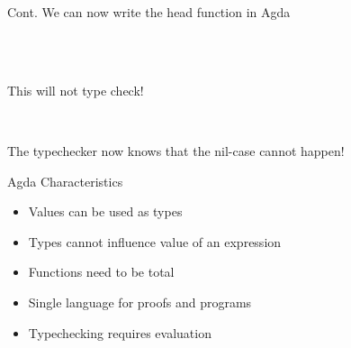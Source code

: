 \begin{frame}[fragile]{Cont.}
We can now write the head function in Agda
\begin{code}%
\> \AgdaSymbol{:}  \AgdaSymbol{\{} \AgdaSymbol{\}}      \<%
\\
\> \AgdaSymbol{(}  \AgdaSymbol{)} \AgdaSymbol{=} \<%
\\
\>  \AgdaSymbol{=} \<%
\end{code}
\pause
This will not type check!
\par
\pause
\vspace{0.5cm}
\begin{code}%
\> \AgdaSymbol{:}  \AgdaSymbol{\{} \AgdaSymbol{\}}    \AgdaSymbol{(} \AgdaSymbol{)}  \<%
\\
\> \AgdaSymbol{(}  \AgdaSymbol{)} \AgdaSymbol{=} \<%
\end{code}
The typechecker now knows that the nil-case cannot happen!
\end{frame}

\begin{frame}{Agda Characteristics}
\begin{itemize}
\item Values can be used as types
\item Types cannot influence value of an expression
\item Functions need to be total
\item Single language for proofs and programs
\item Typechecking requires evaluation
\end{itemize}
\end{frame}
